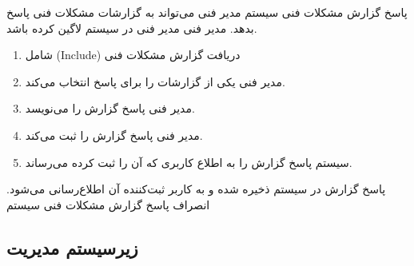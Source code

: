 {
	\usecase
	{پاسخ گزارش مشکلات فنی سیستم}
	{}
	{مدیر فنی می‌تواند به گزارشات مشکلات فنی پاسخ بدهد.}
	{مدیر فنی}
	{}
	{مدیر فنی در سیستم لاگین کرده باشد.}
	{
		\vspace*{-0.6cm}
		\begin{enumerate}
			\item 
شامل (Include) دریافت گزارش مشکلات فنی
			\item
مدیر فنی یکی از گزارشات را برای پاسخ انتخاب می‌کند.
			\item
مدیر فنی پاسخ گزارش را می‌نویسد.
			\item
مدیر فنی پاسخ گزارش را ثبت می‌کند.

\item 
سیستم پاسخ گزارش را به اطلاع کاربری که آن را ثبت کرده می‌رساند.
		\end{enumerate}
	}
	{پاسخ گزارش در سیستم ذخیره شده و به کاربر ثبت‌کننده آن اطلاع‌رسانی می‌شود.}
	{
		انصراف
	}
	{
پاسخ گزارش مشکلات فنی سیستم
	}

}

\newpage
\subsection{زیرسیستم مدیریت}

